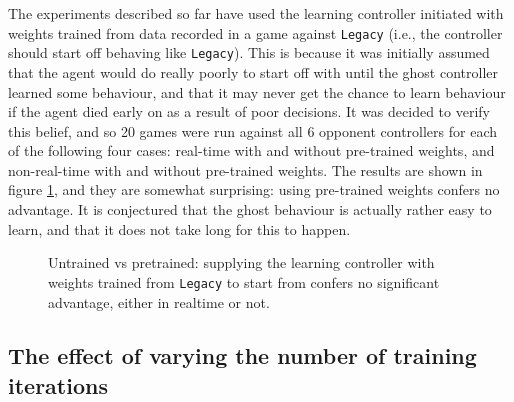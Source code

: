 The experiments described so far have used the learning controller initiated with weights trained from data recorded in a game against {\tt Legacy} (i.e., the controller should start off behaving like {\tt Legacy}).  This is because it was initially assumed that the agent would do really poorly to start off with until the ghost controller learned some behaviour, and that it may never get the chance to learn behaviour if the agent died early on as a result of poor decisions.  It was decided to verify this belief, and so 20 games were run against all 6 opponent controllers for each of the following four cases: real-time with and without pre-trained weights, and non-real-time with and without pre-trained weights.  The results are shown in figure \ref{fig:resultsuntrained}, and they are somewhat surprising: using pre-trained weights confers no advantage.  It is conjectured that the ghost behaviour is actually rather easy to learn, and that it does not take long for this to happen.

\begin{figure}
\centering
{}
\caption[Untrained vs pretrained]{Untrained vs pretrained: supplying the learning controller with weights trained from {\tt Legacy} to start from confers no significant advantage, either in realtime or not.}
\label{fig:resultsuntrained}
\end{figure}


\subsection{The effect of varying the number of training iterations}

